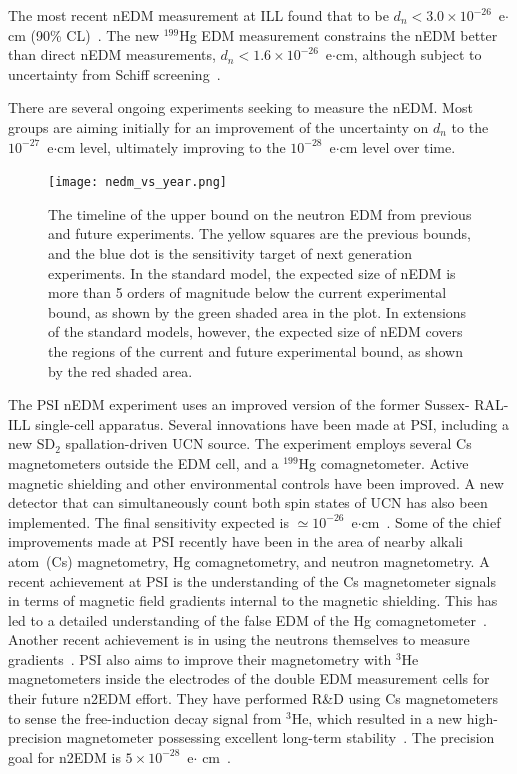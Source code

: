 The most recent nEDM measurement at ILL found that to be
$d_n< 3.0 \times 10^{-26}$~e$\cdot$cm (90\%
CL)~\cite{Baker2006, Pendlebury2015}. The new $^{199}$Hg EDM measurement
constrains the nEDM better than direct nEDM measurements,
$d_n < 1.6 \times 10^{-26}$~e$\cdot$cm, although subject to
uncertainty from Schiff screening~\cite{graner2016reduced}.

There are several ongoing experiments seeking to measure the
nEDM. Most groups are aiming initially for an improvement of the
uncertainty on $d_n$ to the $10^{-27}$~e$\cdot$cm level, ultimately
improving to the $10^{-28}$~e$\cdot$cm level over time.


\begin{figure}[h!]
  \centering
  \texttt{[image: nedm\_vs\_year.png]}
  \caption[History of nEDM measurement]{The timeline of the upper
    bound on the neutron EDM from previous and future experiments. The
    yellow squares are the previous bounds, and the blue dot is the
    sensitivity target of next generation experiments.  In the
    standard model, the expected size of nEDM is more than 5 orders of
    magnitude below the current experimental bound, as shown by the
    green shaded area in the plot. In extensions of the standard
    models, however, the expected size of nEDM covers the regions of
    the current and future experimental bound, as shown by the red
    shaded area.~\cite{yoon2018neutron} }
  \label{fig:nEDMhistory}
\end{figure}

The PSI nEDM experiment uses an improved version of the former Sussex-
RAL-ILL single-cell apparatus. Several innovations have been made at
PSI, including a new SD$_2$ spallation-driven UCN source. The
experiment employs several Cs magnetometers outside the EDM cell, and
a $^{199}$Hg comagnetometer. Active magnetic shielding and other
environmental controls have been improved. A new detector that can
simultaneously count both spin states of UCN has also been
implemented. The final sensitivity expected is
$\simeq 10^{-26}$~e$\cdot$cm~\cite{Schmidt2016}. Some of the chief
improvements made at PSI recently have been in the area of nearby
alkali atom~(Cs) magnetometry, Hg comagnetometry, and neutron
magnetometry. A recent achievement at PSI is the understanding of the
Cs magnetometer signals in terms of magnetic field gradients internal
to the magnetic shielding. This has led to a detailed understanding of
the false EDM of the Hg comagnetometer~\cite{Afach2015_2}. Another
recent achievement is in using the neutrons themselves to measure
gradients~\cite{Afach2015_3}. PSI also aims to improve their
magnetometry with $^3$He magnetometers inside the electrodes of the
double EDM measurement cells for their future n2EDM effort. They have
performed R\&D using Cs magnetometers to sense the free-induction
decay signal from $^3$He, which resulted in a new high-precision
magnetometer possessing excellent long-term
stability~\cite{Koch2015}. The precision goal for n2EDM is
$5 \times 10^{-28}$~e$\cdot$ cm~\cite{Bernhard_talk,baker2011search}.


